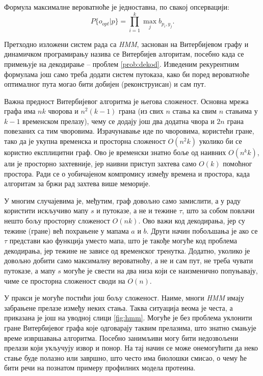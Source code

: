 \documentclass[12pt,oneside]{memoir}
\begin{document}
\begin{CJK}{UTF8}{ipxm}
Формула максималне вероватноће је једноставна, по свакој опсервацији: $$P\{o_{opt} | p\} = \prod_{i=1}^k \max_j b_{p_i, y_j}.$$

Претходно изложени систем рада са \textit{HMM}, заснован на Витербијевом графу и динамичком програмирању назива се Витербијев алгоритам\cite{ba10c}, посебно када се примењује на декодирање -- проблем \ref{prob:dekod}. Изведеним рекурентним формулама још само треба додати систем путоказа, како би поред вероватноће оптималног пута могао бити добијен (реконструисан) и сам пут.

Важна предност Витербијевог алгоритма је његова сложеност. Основна мрежа графа има $nk$ чворова и $n^2 (k-1)$ грана (из свих $n$ стања ка свим $n$ стањима у $k-1$ временском прелазу), чему се додају још два додатна чвора и $2n$ грана повезаних са тим чворовима. Израчунавање иде по чворовима, користећи гране, тако да је укупна временска и просторна сложеност $O(n^2 k)$ уколико би се користио експлицитни граф. Ово је временски знатно боље од наивних $O(n^k k)$, али је просторно захтевније, јер наивни приступ захтева само $O(k)$ помоћног простора. Ради се о уобичајеном компромису између времена и простора, када алгоритам за бржи рад захтева више меморије.

У многим случајевима је, међутим, граф довољно само замислити, а у раду користити искључиво мапу $s$ и путоказе, а не и тежине $\tau$, што за собом повлачи нешто бољу просторну сложеност $O(nk)$. Ово важи код декодирања, јер су тежине (гране) већ похрањене у мапама $a$ и $b$. Други начин побољшања је ако се $\tau$ представи као функција уместо мапа, што је такође могуће код проблема декодирања, јер тежине не зависе од временског тренутка. Додатно, уколико је довољно добити само максималну вероватноћу, а не и сам пут, не треба чувати путоказе, а мапу $s$ могуће је свести на два низа који се наизменично попуњавају, чиме се просторна сложеност своди на $O(n)$.

У пракси је могуће постићи још бољу сложеност. Наиме, многи \textit{HMM} имају забрањене прелазе између неких стања. Таква ситуација веома је честа, а приказана је још на уводној слици \ref{fig:hmm}. Могуће је без проблема уклонити гране Витербијевог графа које одговарају таквим прелазима, што знатно смањује време извршавања алгоритма. Посебно занимљиви могу бити недозвољени прелази који укључују извор и понор. На тај начин се може онемогућити да неко стање буде полазно или завршно, што често има биолошки смисао, о чему ће бити речи на познатом примеру профилних модела протеина.


\end{CJK}
\end{document}
